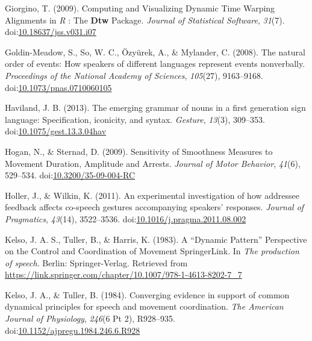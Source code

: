 \documentclass[
  man, noextraspace,floatsintext]{apa6}
\newlength{\cslhangindent}
\newenvironment{cslreferences}%
  {\setlength{\parindent}{0pt}%
  \everypar{\setlength{\hangindent}{\cslhangindent}}\ignorespaces}%
  {\par}
\begin{document}
\begin{cslreferences}
\leavevmode\hypertarget{ref-giorginoComputingVisualizingDynamic2009}{}%
Giorgino, T. (2009). Computing and Visualizing Dynamic Time Warping Alignments in \emph{R} : The \textbf{Dtw} Package. \emph{Journal of Statistical Software}, \emph{31}(7). doi:\href{https://doi.org/10.18637/jss.v031.i07}{10.18637/jss.v031.i07}

\leavevmode\hypertarget{ref-goldin-meadowNaturalOrderEvents2008}{}%
Goldin-Meadow, S., So, W. C., Özyürek, A., \& Mylander, C. (2008). The natural order of events: How speakers of different languages represent events nonverbally. \emph{Proceedings of the National Academy of Sciences}, \emph{105}(27), 9163--9168. doi:\href{https://doi.org/10.1073/pnas.0710060105}{10.1073/pnas.0710060105}

\leavevmode\hypertarget{ref-havilandEmergingGrammarNouns2013}{}%
Haviland, J. B. (2013). The emerging grammar of nouns in a first generation sign language: Specification, iconicity, and syntax. \emph{Gesture}, \emph{13}(3), 309--353. doi:\href{https://doi.org/10.1075/gest.13.3.04hav}{10.1075/gest.13.3.04hav}

\leavevmode\hypertarget{ref-hoganSensitivitySmoothnessMeasures2009}{}%
Hogan, N., \& Sternad, D. (2009). Sensitivity of Smoothness Measures to Movement Duration, Amplitude and Arrests. \emph{Journal of Motor Behavior}, \emph{41}(6), 529--534. doi:\href{https://doi.org/10.3200/35-09-004-RC}{10.3200/35-09-004-RC}

\leavevmode\hypertarget{ref-hollerExperimentalInvestigationHow2011}{}%
Holler, J., \& Wilkin, K. (2011). An experimental investigation of how addressee feedback affects co-speech gestures accompanying speakers' responses. \emph{Journal of Pragmatics}, \emph{43}(14), 3522--3536. doi:\href{https://doi.org/10.1016/j.pragma.2011.08.002}{10.1016/j.pragma.2011.08.002}

\leavevmode\hypertarget{ref-kelsoDynamicPatternPerspective1983}{}%
Kelso, J. A. S., Tuller, B., \& Harris, K. (1983). A ``Dynamic Pattern'' Perspective on the Control and Coordination of Movement \textbar{} SpringerLink. In \emph{The production of speech}. Berlin: Springer-Verlag. Retrieved from \url{https://link.springer.com/chapter/10.1007/978-1-4613-8202-7_7}

\leavevmode\hypertarget{ref-kelsoConvergingEvidenceSupport1984}{}%
Kelso, J. A., \& Tuller, B. (1984). Converging evidence in support of common dynamical principles for speech and movement coordination. \emph{The American Journal of Physiology}, \emph{246}(6 Pt 2), R928--935. doi:\href{https://doi.org/10.1152/ajpregu.1984.246.6.R928}{10.1152/ajpregu.1984.246.6.R928}


\end{cslreferences}
\end{document}
